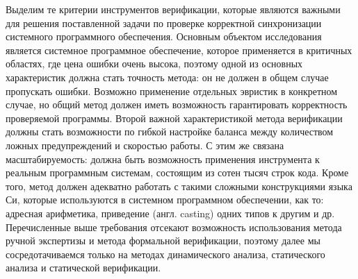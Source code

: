 Выделим те критерии инструментов верификации, которые являются важными для решения поставленной задачи по проверке корректной синхронизации системного программного обеспечения.
Основным объектом исследования является системное программное обеспечение, которое применяется в критичных областях, где цена ошибки очень высока, поэтому одной из основных характеристик должна стать точность метода: он не должен в общем случае пропускать ошибки.
Возможно применение отдельных эвристик в конкретном случае, но общий метод должен иметь возможность гарантировать корректность проверяемой программы.
Второй важной характеристикой метода верификации должны стать возможности по гибкой настройке баланса между количеством ложных предупреждений и скоростью работы.
С этим же связана масштабируемость: должна быть возможность применения инструмента к реальным программным системам, состоящим из сотен тысяч строк кода.
Кроме того, метод должен адекватно работать с такими сложными конструкциями языка Си, которые используются в системном программном обеспечении, как то: адресная арифметика, приведение (англ. casting) одних типов к другим и др.
Перечисленные выше требования отсекают возможность использования метода ручной экспертизы и метода формальной верификации, поэтому далее мы сосредотачиваемся только на методах динамического анализа, статического анализа и статической верификации.


%

